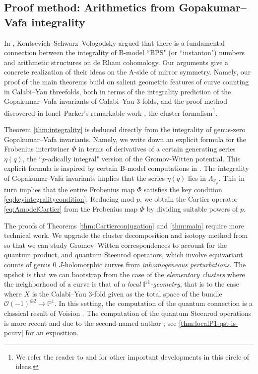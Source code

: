 \documentclass[reqno]{amsart}
\numberwithin{equation}{section}
\numberwithin{equation}{section}
\numberwithin{equation}{section}
\theoremstyle{definition}
\theoremstyle{remark}
\theoremstyle{remark}
\begin{document}
\subsection{Proof method: Arithmetics from Gopakumar--Vafa integrality}\label{sect:Gopakumar}
In \cite{KSV06}, Kontsevich--Schwarz--Vologodsky argued that there is a fundamental connection between the integrality of B-model ``BPS" (or ``instanton") numbers and arithmetic structures on de Rham cohomology.  Our arguments give a concrete realization of their ideas on the A-side of mirror symmetry. Namely, our proof of the main theorems build on salient geometric features of curve counting in Calabi--Yau threefolds, both in terms of the integrality prediction of the Gopakumar--Vafa invariants of Calabi--Yau $3$-folds, and the proof method discovered in Ionel--Parker's remarkable work \cite{IP-GV}, the cluster formalism\footnote{We refer the reader to  \cite{doan2021gopakumar} and \cite{pardon-MNOP} for other important developments in this circle of ideas. }. 

Theorem \ref{thm:integrality} is deduced directly from the integrality of genus-zero Gopakumar--Vafa invariants. Namely, we write down an explicit formula for the Frobenius intertwiner $\Phi$ in terms of derivatives of a certain generating series $\eta(q)$, the ``$p$-adically integral" version of the Gromov-Witten potential. This explicit formula is inspired by certain B-model computations in \cite{KSV06}. The integrality of Gopakumar-Vafa invariants implies that the series  $\eta(q)$ lies in $\Lambda_{\mathbb{Z}_p}.$ This in turn implies that the entire Frobenius map $\Phi$ satisfies the key condition \eqref{eq:keyintegralitycondition}. Reducing mod $p$, we obtain the Cartier operator \eqref{eq:AmodelCartier} from the Frobenius map $\Phi$ by dividing suitable powers of $p$.

The proofs of Theorems \ref{thm:Cartierconjugation} and  \ref{thm:main} require more technical work. We upgrade the cluster decomposition and isotopy method from \cite{IP-GV} so that we can study Gromov--Witten correspondences to account for the quantum product, and quantum Steenrod operators, which involve equivariant counts of genus $0$ $J$-holomorphic curves from \emph{inhomogeneous perturbations}. The upshot is that we can bootstrap from the case of the \emph{elementary clusters} where the neighborhood of a curve is that of a \emph{local $\mathbb{P}^1$-geometry}, that is to the case where $X$ is the Calabi--Yau 3-fold given as the total space of the bundle $\mathcal{O}(-1)^{\oplus 2} \to \mathbb{P}^1$. In this setting, the computation of the quantum connection is a classical result of Voision \cite[Theorem 1.1]{Voi96}. The computation of the quantum Steenrod operations is more recent and due to the second-named author \cite[Section 3]{Lee23a}; see \cref{thm:localP1-qst-is-pcurv} for an exposition.
\end{document}

